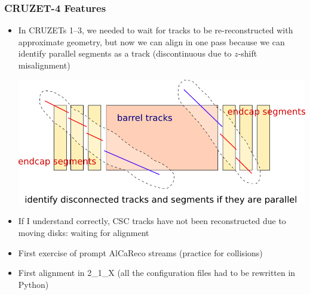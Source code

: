 \documentclass[compress]{beamer}
\begin{document}
\begin{frame}
\frametitle{CRUZET-4 Features}

\small

\begin{itemize}\setlength{\itemsep}{0.2 cm}
\item In CRUZETs 1--3, we needed to wait for tracks to be re-reconstructed
  with approximate geometry, but now we can align in one pass because
  we can identify parallel segments as a track (discontinuous due to $z$-shift misalignment)
\begin{center}
\includegraphics[width=0.75\linewidth]{identify_if_parallel}
\end{center}
\item If I understand correctly, CSC tracks have not been reconstructed due to moving disks: waiting for alignment

\item First exercise of prompt AlCaReco streams (practice for collisions)

\item First alignment in 2\_1\_X (all the configuration files had to be rewritten in Python)
\end{itemize}
\end{frame}
\end{document}

